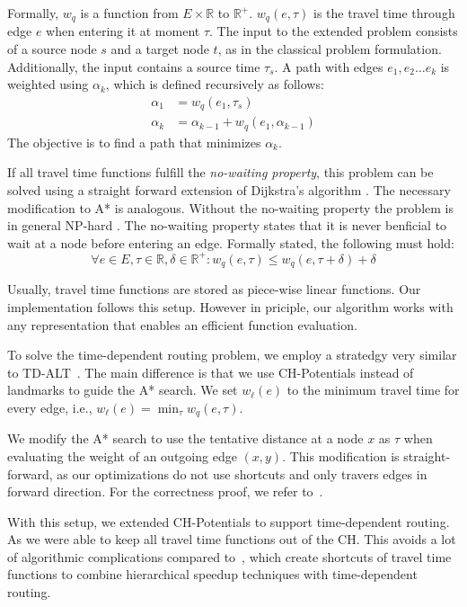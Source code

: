 \documentclass[letterpaper]{article} %
\begin{document}
Formally, $w_q$ is a function from $E\times \mathbb{R}$ to $\mathbb{R}^+$. 
$w_q(e, \tau)$ is the travel time through edge $e$ when entering it at moment $\tau$.
The input to the extended problem consists of a source node $s$ and a target node $t$, as in the classical problem formulation.
Additionally, the input contains a source time $\tau_s$.
A path with edges $e_1,e_2\ldots e_k$ is weighted using $\alpha_k$, which is defined recursively as follows:\[
\begin{split}
\alpha_{1} & = w_q(e_1, \tau_s) \\
\alpha_{k} & = \alpha_{k-1} + w_q(e_1, \alpha_{k-1})
\end{split}
\]
The objective is to find a path that minimizes $\alpha_k$.

If all travel time functions fulfill the \emph{no-waiting property}, this problem can be solved using a straight forward extension of Dijkstra's algorithm \cite{td-alt?}.
The necessary modification to A* is analogous.
Without the no-waiting property the problem is in general NP-hard \cite{veit}.
The no-waiting property states that it is never benficial to wait at a node before entering an edge.
Formally stated, the following must hold:\[
\forall e\in E,\tau\in \mathbb{R},\delta\in \mathbb{R}^+: w_q(e, \tau) \le w_q(e, \tau+\delta) + \delta
\]

Usually, travel time functions are stored as piece-wise linear functions.
Our implementation follows this setup.
However in priciple, our algorithm works with any representation that enables an efficient function evaluation.

To solve the time-dependent routing problem, we employ a stratedgy very similar to TD-ALT~\cite{td-alt}.
The main difference is that we use CH-Potentials instead of landmarks to guide the A* search.
We set $w_\ell(e)$ to the minimum travel time for every edge, i.e., $w_\ell(e) = \min_\tau w_q(e,\tau)$.

We modify the A* search to use the tentative distance at a node $x$ as $\tau$ when evaluating the weight of an outgoing edge $(x,y)$.
This modification is straight-forward, as our optimizations do not use shortcuts and only travers edges in forward direction.
For the correctness proof, we refer to~\cite{td-alt?}.

With this setup, we extended CH-Potentials to support time-dependent routing.
As we were able to keep all travel time functions out of the CH.
This avoids a lot of algorithmic complications compared to~\cite{TD-CH,CatchUp,TD-CRP}, which create shortcuts of travel time functions to combine hierarchical speedup techniques with time-dependent routing.
\end{document}
